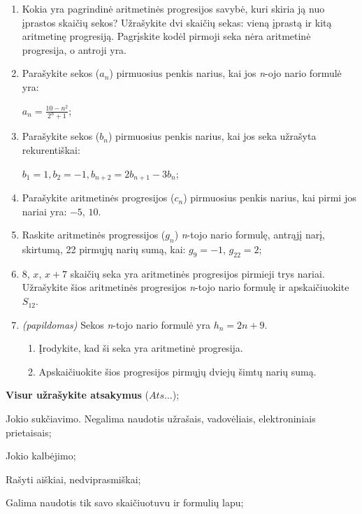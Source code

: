 \documentclass[a4paper]{article}
\begin{document}
\begin{enumerate}
      \item Kokia yra pagrindinė aritmetinės progresijos savybė, kuri skiria ją
            nuo įprastos skaičių sekos? Užrašykite dvi skaičių sekas: vieną
            įprastą ir kitą aritmetinę progresiją. Pagrįskite kodėl pirmoji
            seka nėra
            aritmetinė progresija, o antroji yra.

      \item Parašykite sekos ($a_{n}$) pirmuosius penkis
            narius, kai jos \textit{n}-ojo nario formulė yra:

            $a_{n}=\frac{10 - n^2}{2^{n} + 1}$;

      \item Parašykite sekos ($b_{n}$) pirmuosius penkis
            narius, kai jos seka užrašyta rekurentiškai:

            $b_1 = 1, b_{2} = -1, b_{n+2}=2b_{n+1}-3b_{n}$;

      \item Parašykite aritmetinės progresijos ($c_{n}$) pirmuosius penkis
            narius, kai pirmi jos nariai yra: $-5$, $10$.

      \item Raskite aritmetinės progressijos ($g_{n}$) \textit{n}-tojo nario
            formulę, antrąjį narį,
            skirtumą, 22 pirmųjų narių sumą, kai:
            $g_{9} = -1$, $g_{22}=2$;
      \item $ 8 $, $ x $, $ x+ 7$ skaičių seka yra aritmetinės progresijos
            pirmieji trys nariai. Užrašykite šios aritmetinės progresijos
            \textit{n}-tojo
            nario formulę ir apskaičiuokite $S_{12}$.

      \item \textit{(papildomas)} Sekos \textit{n}-tojo nario formulė yra $h_{n} = 2n+9$. 
      \begin{enumerate}[label= (\alph*)]
            \item Įrodykite, kad ši seka yra aritmetinė progresija.
            \item Apskaičiuokite šios progresijos pirmųjų dviejų šimtų narių sumą.
      \end{enumerate} 
\end{enumerate}

\begin{small}
      \begin{enumerate*}[label={(\arabic*)}]
            \item \textbf{Visur užrašykite atsakymus} ($Ats\ldots$);
            \item Jokio sukčiavimo. Negalima naudotis užrašais, vadovėliais,
            elektroniniais prietaisais;
            \item Jokio kalbėjimo;
            \item Rašyti aiškiai, nedviprasmiškai;
            \item Galima naudotis tik savo skaičiuotuvu ir formulių lapu;
      \end{enumerate*}
\end{small}
\end{document}
